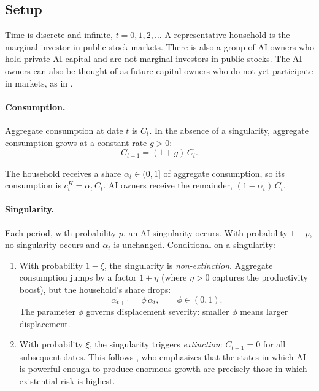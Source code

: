 \documentclass[12pt]{article}
\begin{document}
\subsection{Setup} %

Time is discrete and infinite, $t = 0, 1, 2, \ldots$ A representative household is the marginal investor in public stock markets. There is also a group of AI owners who hold private AI capital and are not marginal investors in public stocks. The AI owners can also be thought of as future capital owners who do not yet participate in markets, as in \citet{GKP2012}.

\paragraph{Consumption.}
Aggregate consumption at date $t$ is $C_t$. In the absence of a singularity, aggregate consumption grows at a constant rate $g > 0$:
%
\begin{equation}
C_{t+1} = (1 + g) \, C_t. \label{eq:agg-consumption-growth}
\end{equation}

The household receives a share $\alpha_t \in (0,1]$ of aggregate consumption, so its consumption is $c_t^H = \alpha_t \, C_t$. AI owners receive the remainder, $(1 - \alpha_t) \, C_t$.

\paragraph{Singularity.}
Each period, with probability $p$, an AI singularity occurs. With probability $1 - p$, no singularity occurs and $\alpha_t$ is unchanged. Conditional on a singularity:
%
\begin{enumerate}
\item With probability $1 - \xi$, the singularity is \emph{non-extinction}. Aggregate consumption jumps by a factor $1 + \eta$ (where $\eta > 0$ captures the productivity boost), but the household's share drops:
\begin{equation}
\alpha_{t+1} = \phi \, \alpha_t, \qquad \phi \in (0,1). \label{eq:displacement}
\end{equation}
The parameter $\phi$ governs displacement severity: smaller $\phi$ means larger displacement.
\item With probability $\xi$, the singularity triggers \emph{extinction}: $C_{t+1} = 0$ for all subsequent dates. This follows \citet{Jones2024}, who emphasizes that the states in which AI is powerful enough to produce enormous growth are precisely those in which existential risk is highest.
\end{enumerate}
\end{document}
